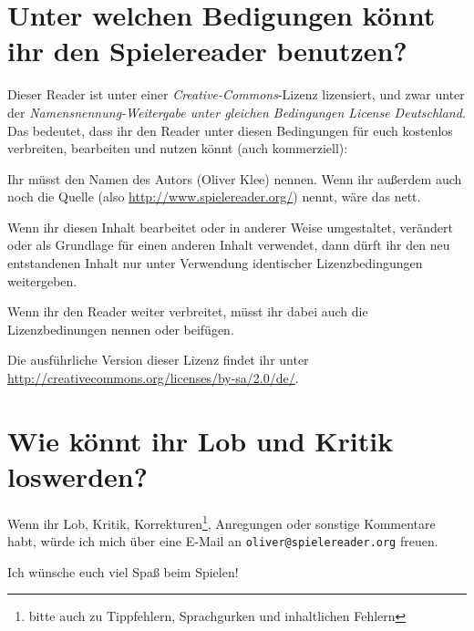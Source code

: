 \section{Unter welchen Bedigungen könnt ihr den Spielereader benutzen?}
Dieser Reader ist unter einer \emph{Creative-Commons}-Lizenz lizensiert, und zwar unter der \emph{Namensnennung-Weitergabe unter gleichen Bedingungen License Deutschland}. Das bedeutet, dass ihr den Reader unter diesen Bedingungen für euch kostenlos verbreiten, bearbeiten und nutzen könnt (auch kommerziell):
\begin{description}
  \item[Namensnennung.] Ihr müsst den Namen des Autors (Oliver Klee) nennen. Wenn ihr außerdem auch noch die Quelle (also \url{http://www.spielereader.org/}) nennt, wäre das nett.
  \item[Weitergabe unter gleichen Bedingungen.] Wenn ihr diesen Inhalt bearbeitet oder in anderer Weise umgestaltet, verändert oder als Grundlage für einen anderen Inhalt verwendet, dann dürft ihr den neu entstandenen Inhalt nur unter Verwendung identischer Lizenzbedingungen weitergeben.
  \item Wenn ihr den Reader weiter verbreitet, müsst ihr dabei auch die Lizenzbedinungen nennen oder beifügen.
\end{description} 

Die ausführliche Version dieser Lizenz findet ihr unter \url{http://creativecommons.org/licenses/by-sa/2.0/de/}.

\section{Wie könnt ihr Lob und Kritik loswerden?}
Wenn ihr Lob, Kritik, Korrekturen\footnote{bitte auch zu Tippfehlern, Sprachgurken und inhaltlichen Fehlern}, Anregungen oder sonstige Kommentare habt, würde ich mich über eine E-Mail an \texttt{oliver@spielereader.org} freuen.

Ich wünsche euch viel Spaß beim Spielen!

